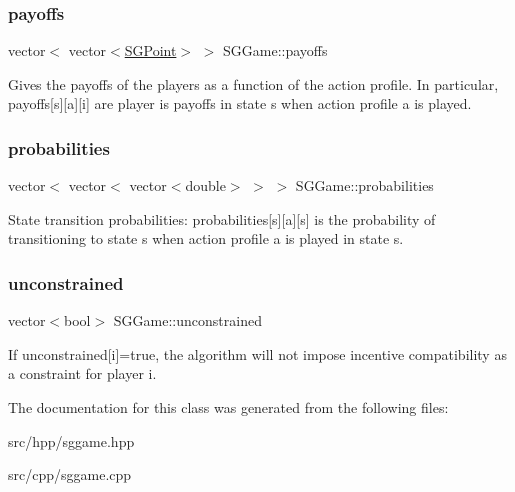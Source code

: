 \subsubsection{\texorpdfstring{payoffs}{payoffs}}
{\footnotesize\ttfamily vector$<$ vector$<$\hyperlink{classSGPoint}{S\+G\+Point}$>$ $>$ S\+G\+Game\+::payoffs\hspace{0.3cm}{\ttfamily [private]}}

Gives the payoffs of the players as a function of the action profile. In particular, payoffs\mbox{[}s\mbox{]}\mbox{[}a\mbox{]}\mbox{[}i\mbox{]} are player i\textquotesingle{}s payoffs in state s when action profile a is played. \mbox{\label{classSGGame_a167a281b11d524cb4a11dbaff3e9de68}} 
\subsubsection{\texorpdfstring{probabilities}{probabilities}}
{\footnotesize\ttfamily vector$<$ vector$<$ vector$<$double$>$ $>$ $>$ S\+G\+Game\+::probabilities\hspace{0.3cm}{\ttfamily [private]}}

State transition probabilities\+: probabilities\mbox{[}s\mbox{]}\mbox{[}a\mbox{]}\mbox{[}s\textquotesingle{}\mbox{]} is the probability of transitioning to state s\textquotesingle{} when action profile a is played in state s. \mbox{\label{classSGGame_a528852e11bd68322535d7f24a41eca20}} 
\subsubsection{\texorpdfstring{unconstrained}{unconstrained}}
{\footnotesize\ttfamily vector$<$bool$>$ S\+G\+Game\+::unconstrained\hspace{0.3cm}{\ttfamily [private]}}

If unconstrained\mbox{[}i\mbox{]}=true, the algorithm will not impose incentive compatibility as a constraint for player i. 

The documentation for this class was generated from the following files\+:\begin{DoxyCompactItemize}
\item 
src/hpp/sggame.\+hpp\item 
src/cpp/sggame.\+cpp\end{DoxyCompactItemize}
